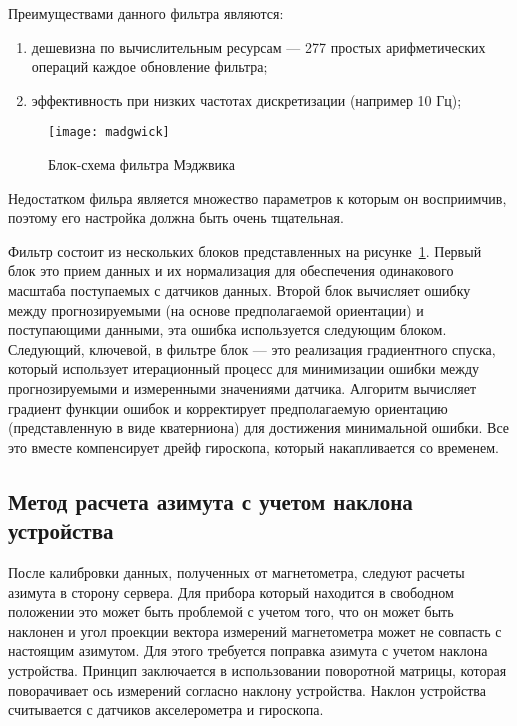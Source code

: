 Преимуществами данного фильтра являются:

\begin{enumerate}
    \item дешевизна по вычислительным ресурсам — 277 простых арифметических операций каждое обновление фильтра;
    \item эффективность при низких частотах дискретизации (например 10 Гц);
\end{enumerate}

\begin{figure}[ht]
    \centering
    \texttt{[image: madgwick]}
    \caption{Блок-схема фильтра Мэджвика}
    \label{pic::domain::madgwick}
\end{figure}

Недостатком фильра является множество параметров к которым он восприимчив, поэтому его настройка должна быть очень тщательная.

Фильтр состоит из нескольких блоков представленных на рисунке~\ref{pic::domain::madgwick}.
Первый блок это прием данных и их нормализация для обеспечения одинакового 
масштаба поступаемых с датчиков данных.
Второй блок вычисляет ошибку между прогнозируемыми (на основе предполагаемой ориентации) и поступающими данными, 
эта ошибка используется следующим блоком.
Следующий, ключевой, в фильтре блок --- это реализация градиентного спуска, который 
использует итерационный процесс для минимизации ошибки между прогнозируемыми и 
измеренными значениями датчика. Алгоритм вычисляет градиент функции ошибок и корректирует
предполагаемую ориентацию (представленную в виде кватерниона) для достижения минимальной ошибки.
Все это вместе компенсирует дрейф гироскопа, который накапливается со временем.

\subsection{Метод расчета азимута с учетом наклона устройства}

После калибровки данных, полученных от магнетометра, следуют расчеты азимута в сторону сервера.
Для прибора который находится в свободном положении это может быть проблемой с учетом того, что
он может быть наклонен и угол проекции вектора измерений магнетометра может не совпасть с настоящим азимутом.
Для этого требуется поправка азимута с учетом наклона устройства. Принцип заключается в использовании 
поворотной матрицы, которая поворачивает ось измерений согласно наклону устройства. Наклон устройства 
считывается с датчиков акселерометра и гироскопа.

